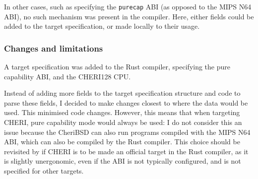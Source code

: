 \documentclass[dissertation.tex]{subfiles}
\begin{document}
In other cases, such as specifying the \texttt{purecap} ABI (as opposed
to the MIPS N64 ABI), no such mechanism was present in the compiler.
Here, either fields could be added to the target specification, or made
locally to their usage.


\subsubsection{Changes and limitations}
A target specification was added to the Rust compiler, specifying the
pure capability ABI, and the CHERI128 CPU.

Instead of adding more fields to the target specification structure and
code to parse these fields, I decided to make changes closest to where
the data would be used.
This minimised code changes.
However, this means that when targeting CHERI, pure capability mode
would always be used: I do not consider this an issue because the
CheriBSD can also run programs compiled with the MIPS N64 ABI, which can
also be compiled by the Rust compiler.
This choice should be revisited by if CHERI is to be made an official
target in the Rust compiler, as it is slightly unergonomic, even if the
ABI is not typically configured, and is not specified for other targets.
\end{document}
